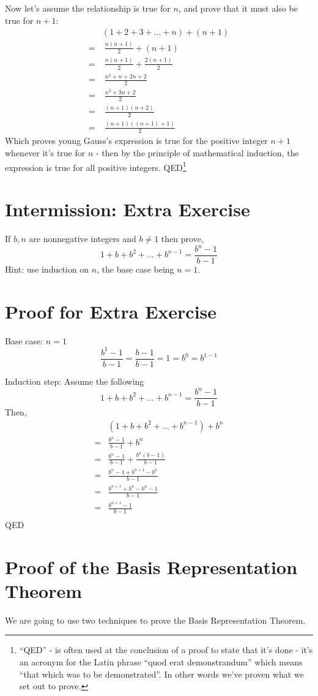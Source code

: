 \documentclass{article}
\begin{document}
Now let's assume the relationship is true for $n$,
and prove that it must also be true for $n+1$:
\begin{align*}
&(1+2+3+\ldots+n) + (n+1)\\
= & \; \frac{n(n+1)}{2} + (n+1)\\
= & \; \frac{n(n+1)}{2} + \frac{2(n+1)}{2}\\
= & \; \frac{n^2+n+2n+2}{2}\\
= & \; \frac{n^2+3n+2}{2}\\
= & \; \frac{(n+1)(n+2)}{2}\\
= & \; \frac{(n+1)((n+1)+1)}{2}
\end{align*}
Which proves young Gauss's expression is true for
the positive integer $n+1$ whenever it's true for $n$ - then
by the principle of mathematical induction,
the expression is true for all positive integers. QED\footnote{``QED'' - is often used at the conclusion of a proof to state that it’s
done - it’s an acronym for the Latin phrase ``quod erat demonstrandum'' which means ``that which was to be demonstrated''.
In other words we’ve proven what we set out to prove.}

\section*{Intermission: Extra Exercise}
If $b, n$ are nonnegative integers and $b\ne1$ then prove,
\[1+b+b^2+\dots+b^{n-1} = \frac{b^n-1}{b-1}\]
Hint: use induction on $n$, the base case being $n=1$.

\section*{Proof for Extra Exercise}
Base case: $n=1$
\[\frac{b^1-1}{b-1}=\frac{b-1}{b-1}=1=b^0=b^{1-1}\]

Induction step:
Assume the following
\[1+b+b^2+\dots+b^{n-1} = \frac{b^n-1}{b-1}\]
Then,
\begin{align*}
&(1+b+b^2+\dots+b^{n-1}) + b^n\\
= &\frac{b^n-1}{b-1}+b^n\\
= &\frac{b^n-1}{b-1}+\frac{b^n(b-1)}{b-1}\\
= &\frac{b^n-1+b^{n+1}-b^n}{b-1}\\
= &\frac{b^{n+1}+b^n-b^n-1}{b-1}\\
= &\frac{b^{n+1}-1}{b-1}\\
\end{align*}
QED
\section*{Proof of the  Basis Representation Theorem}
We are going to use two techniques to prove the Basis Representation Theorem.
\end{document}
